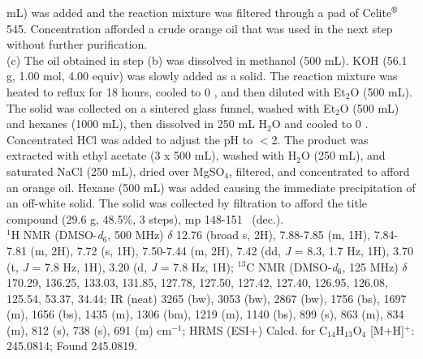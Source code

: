 mL) was added and the reaction mixture was filtered through a pad of
Celite$\textsuperscript{\textregistered}$ 545. Concentration afforded a crude
orange oil that was used in the next step without further purification. \\ 
(c) The oil obtained in step (b) was dissolved in methanol
(500 mL). KOH (56.1 g, 1.00 mol, 4.00 equiv) was slowly added as a
solid. The reaction mixture was heated to reflux for 18 hours, cooled to 0
\degc, and then diluted with Et$_2$O (500 mL). The solid was collected on a
sintered glass funnel, washed with Et$_2$O (500 mL) and hexanes (1000 mL), then dissolved
in 250 mL H$_2$O and cooled to 0 \degc. Concentrated HCl was added to
adjust the pH to $<$2. The product was extracted with ethyl acetate (3 x 500
mL), washed with H$_2$O (250 mL), and saturated NaCl (250 mL), dried over
MgSO$_4$, filtered, and concentrated to afford an orange oil. Hexane (500 mL)
was added causing the immediate precipitation of an off-white solid. The solid
was collected by filtration to afford the title compound (29.6
g, 48.5\%, 3 steps), mp 148-151 \degc\  (dec.). \\
$^1$H NMR (DMSO-\textit{d$_6$}, 500 MHz) $\delta$ 12.76 (broad s, 2H),
7.88-7.85 (m, 1H), 7.84-7.81 (m, 2H), 7.72 (s, 1H), 7.50-7.44 (m, 2H), 7.42 (dd, \textit{J} = 8.3,
1.7 Hz, 1H), 3.70 (t, \textit{J} = 7.8 Hz, 1H), 3.20 (d, \textit{J} = 7.8 Hz, 1H); $^{13}$C NMR
(DMSO-\textit{d$_6$}, 125 MHz) $\delta$ 170.29, 136.25, 133.03, 131.85, 127.78, 127.50, 127.42, 127.40, 126.95, 126.08, 125.54, 53.37,
34.44; IR (neat) 3265 (bw), 3053 (bw), 2867 (bw), 1756 (bs), 1697 (m), 1656
(bs), 1435 (m), 1306 (bm), 1219 (m), 1140 (bs), 899 (s), 863 (m), 834 (m), 812
(s), 738 (s), 691 (m) cm$^{-1}$; HRMS (ESI+) Calcd. for C$_{14}$H$_{13}$O$_{4}$
[M+H]$^+$: 245.0814; Found 245.0819.

